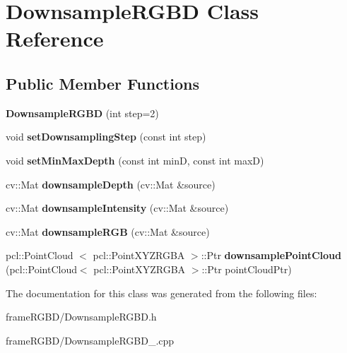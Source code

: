 \hypertarget{classDownsampleRGBD}{\section{\-Downsample\-R\-G\-B\-D \-Class \-Reference}
\label{classDownsampleRGBD}
}
\subsection*{\-Public \-Member \-Functions}
\begin{DoxyCompactItemize}
\item 
\hypertarget{classDownsampleRGBD_a949641abf1e797d8a693e65261a6f86a}{{\bfseries \-Downsample\-R\-G\-B\-D} (int step=2)}\label{classDownsampleRGBD_a949641abf1e797d8a693e65261a6f86a}

\item 
\hypertarget{classDownsampleRGBD_a68dfac62b3e550fa9093408925c032a7}{void {\bfseries set\-Downsampling\-Step} (const int step)}\label{classDownsampleRGBD_a68dfac62b3e550fa9093408925c032a7}

\item 
\hypertarget{classDownsampleRGBD_a5f3be2a91faa624e0697d0ea90369c18}{void {\bfseries set\-Min\-Max\-Depth} (const int min\-D, const int max\-D)}\label{classDownsampleRGBD_a5f3be2a91faa624e0697d0ea90369c18}

\item 
\hypertarget{classDownsampleRGBD_a0e70a31acee0e111a56c0a0a293356e7}{cv\-::\-Mat {\bfseries downsample\-Depth} (cv\-::\-Mat \&source)}\label{classDownsampleRGBD_a0e70a31acee0e111a56c0a0a293356e7}

\item 
\hypertarget{classDownsampleRGBD_af5d2867c08a563a26662f86eef48ecce}{cv\-::\-Mat {\bfseries downsample\-Intensity} (cv\-::\-Mat \&source)}\label{classDownsampleRGBD_af5d2867c08a563a26662f86eef48ecce}

\item 
\hypertarget{classDownsampleRGBD_a817bca9ba2706dc2b0e549184e53441c}{cv\-::\-Mat {\bfseries downsample\-R\-G\-B} (cv\-::\-Mat \&source)}\label{classDownsampleRGBD_a817bca9ba2706dc2b0e549184e53441c}

\item 
\hypertarget{classDownsampleRGBD_acbe2f4ef2ea6b8cbd831c9f844b9ad5c}{pcl\-::\-Point\-Cloud\*
$<$ pcl\-::\-Point\-X\-Y\-Z\-R\-G\-B\-A $>$\-::\-Ptr {\bfseries downsample\-Point\-Cloud} (pcl\-::\-Point\-Cloud$<$ pcl\-::\-Point\-X\-Y\-Z\-R\-G\-B\-A $>$\-::\-Ptr point\-Cloud\-Ptr)}\label{classDownsampleRGBD_acbe2f4ef2ea6b8cbd831c9f844b9ad5c}

\end{DoxyCompactItemize}


\-The documentation for this class was generated from the following files\-:\begin{DoxyCompactItemize}
\item 
frame\-R\-G\-B\-D/\-Downsample\-R\-G\-B\-D.\-h\item 
frame\-R\-G\-B\-D/\-Downsample\-R\-G\-B\-D\-\_\-.\-cpp\end{DoxyCompactItemize}
